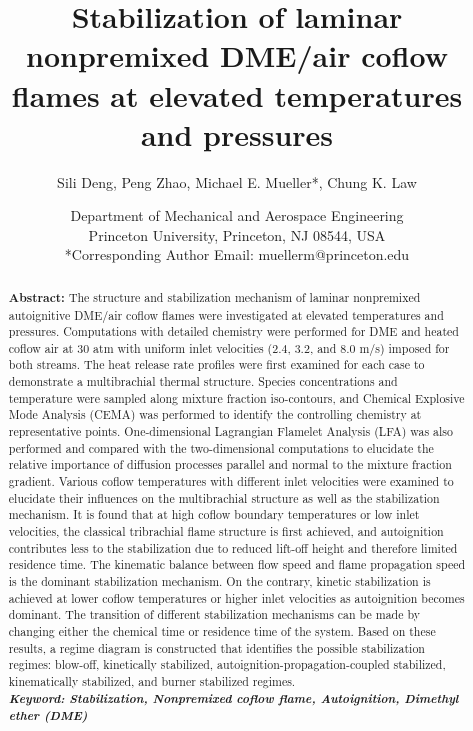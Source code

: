 \documentclass{wssci}
\begin{document}
\title{Stabilization of laminar nonpremixed DME/air coflow flames at elevated temperatures and pressures}

\author{
%
Sili Deng, Peng Zhao, Michael E. Mueller*, Chung K. Law 
%
}
\date{
Department of Mechanical and Aerospace Engineering\\
Princeton University, Princeton, NJ 08544, USA\\
*Corresponding Author Email: muellerm@princeton.edu
%
}

\maketitle
\thispagestyle{fancyplain}

\begin{abstract}
\textbf{Abstract:} The structure and stabilization mechanism of laminar nonpremixed autoignitive DME/air coflow flames were investigated at elevated temperatures and pressures. Computations with detailed chemistry were performed for DME and heated coflow air at $30$ atm with uniform inlet velocities ($2.4$, $3.2$, and $8.0$ m/s) imposed for both streams.  The heat release rate profiles were first examined for each case to demonstrate a multibrachial thermal structure.  Species concentrations and temperature were sampled along mixture fraction iso-contours, and Chemical Explosive Mode Analysis (CEMA) was performed to identify the controlling chemistry at representative points.  One-dimensional Lagrangian Flamelet Analysis (LFA) was also performed and compared with the two-dimensional computations to elucidate the relative importance of diffusion processes parallel and normal to the mixture fraction gradient.  Various coflow temperatures with different inlet velocities were examined to elucidate their influences on the multibrachial structure as well as the stabilization mechanism.  It is found that at high coflow boundary temperatures or low inlet velocities, the classical tribrachial flame structure is first achieved, and autoignition contributes less to the stabilization due to reduced lift-off height and therefore limited residence time.  The kinematic balance between flow speed and flame propagation speed is the dominant stabilization mechanism.  On the contrary, kinetic stabilization is achieved at lower coflow temperatures or higher inlet velocities as autoignition becomes dominant.  The transition of different stabilization mechanisms can be made by changing either the chemical time or residence time of the system.  Based on these results, a regime diagram is constructed that identifies the possible stabilization regimes: blow-off, kinetically stabilized, autoignition-propagation-coupled stabilized, kinematically stabilized, and burner stabilized regimes.\\
\textbf{\textit{Keyword: Stabilization, Nonpremixed coflow flame, Autoignition, Dimethyl ether (DME)}}
\end{abstract}
\end{document}

